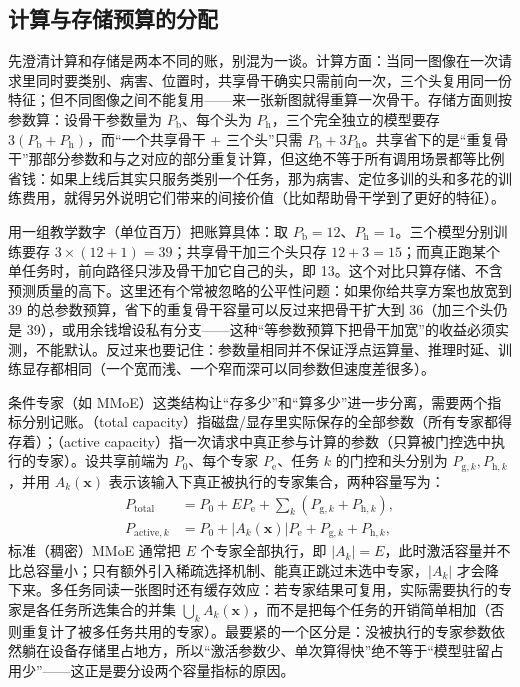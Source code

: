\subsection{计算与存储预算的分配}
\label{sec:ket-sharing-budget}

先澄清计算和存储是两本不同的账，别混为一谈。计算方面：当同一图像在一次请求里同时要类别、病害、位置时，共享骨干确实只需前向一次，三个头复用同一份特征；但不同图像之间不能复用——来一张新图就得重算一次骨干。存储方面则按参数算：设骨干参数量为 $P_{\mathrm b}$、每个头为 $P_{\mathrm h}$，三个完全独立的模型要存 $3(P_{\mathrm b}+P_{\mathrm h})$，而“一个共享骨干 + 三个头”只需 $P_{\mathrm b}+3P_{\mathrm h}$。共享省下的是“重复骨干”那部分参数和与之对应的部分重复计算，但这绝不等于所有调用场景都等比例省钱：如果上线后其实只服务类别一个任务，那为病害、定位多训的头和多花的训练费用，就得另外说明它们带来的间接价值（比如帮助骨干学到了更好的特征）。

用一组教学数字（单位百万）把账算具体：取 $P_{\mathrm b}=12$、$P_{\mathrm h}=1$。三个模型分别训练要存 $3\times(12+1)=39$；共享骨干加三个头只存 $12+3=15$；而真正跑某个单任务时，前向路径只涉及骨干加它自己的头，即 13。这个对比只算存储、不含预测质量的高下。这里还有个常被忽略的公平性问题：如果你给共享方案也放宽到 39 的总参数预算，省下的重复骨干容量可以反过来把骨干扩大到 36（加三个头仍是 39），或用余钱增设私有分支——这种“等参数预算下把骨干加宽”的收益必须实测，不能默认。反过来也要记住：参数量相同并不保证浮点运算量、推理时延、训练显存都相同（一个宽而浅、一个窄而深可以同参数但速度差很多）。

条件专家（如 MMoE）这类结构让“存多少”和“算多少”进一步分离，需要两个指标分别记账。（total capacity）指磁盘/显存里实际保存的全部参数（所有专家都得存着）；（active capacity）指一次请求中真正参与计算的参数（只算被门控选中执行的专家）。设共享前端为 $P_0$、每个专家 $P_{\mathrm e}$、任务 $k$ 的门控和头分别为 $P_{\mathrm g,k},P_{\mathrm h,k}$，并用 $A_k(\bm x)$ 表示该输入下真正被执行的专家集合，两种容量写为：
\begin{align}
  P_{\mathrm{total}}
    &=P_0+EP_{\mathrm e}
      +\sum_k(P_{\mathrm g,k}+P_{\mathrm h,k}),
  \nonumber\\
  P_{\mathrm{active},k}
    &=P_0+|A_k(\bm x)|P_{\mathrm e}
      +P_{\mathrm g,k}+P_{\mathrm h,k},
  \label{eq:ket-sharing-expert-budget}
\end{align}
标准（稠密）MMoE 通常把 $E$ 个专家全部执行，即 $|A_k|=E$，此时激活容量并不比总容量小；只有额外引入稀疏选择机制、能真正跳过未选中专家，$|A_k|$ 才会降下来。多任务同读一张图时还有缓存效应：若专家结果可复用，实际需要执行的专家是各任务所选集合的并集 $\bigcup_k A_k(\bm x)$，而不是把每个任务的开销简单相加（否则重复计了被多任务共用的专家）。最要紧的一个区分是：没被执行的专家参数依然躺在设备存储里占地方，所以“激活参数少、单次算得快”绝不等于“模型驻留占用少”——这正是要分设两个容量指标的原因。

